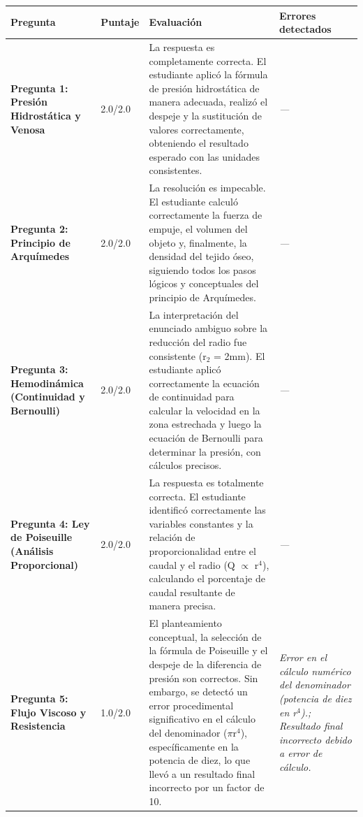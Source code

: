 \documentclass[11pt,a4paper]{article}
\begin{document}
\begin{longtable}{>{\bfseries}p{2.8cm} p{1.6cm} p{7.0cm} p{2.8cm}}
  \toprule
  \textbf{Pregunta} & \textbf{Puntaje} & \textbf{Evaluación} & \textbf{Errores detectados} \\
  \midrule
  \endhead
  \bottomrule
  \endfoot
    \textbf{Pregunta 1: Presión Hidrostática y Venosa} & 2.0/2.0 & La respuesta es completamente correcta. El estudiante aplicó la fórmula de presión hidrostática de manera adecuada, realizó el despeje y la sustitución de valores correctamente, obteniendo el resultado esperado con las unidades consistentes. & \textit{---} \\
    \midrule
    \textbf{Pregunta 2: Principio de Arquímedes} & 2.0/2.0 & La resolución es impecable. El estudiante calculó correctamente la fuerza de empuje, el volumen del objeto y, finalmente, la densidad del tejido óseo, siguiendo todos los pasos lógicos y conceptuales del principio de Arquímedes. & \textit{---} \\
    \midrule
    \textbf{Pregunta 3: Hemodinámica (Continuidad y Bernoulli)} & 2.0/2.0 & La interpretación del enunciado ambiguo sobre la reducción del radio fue consistente (r$_{2}$ = 2mm). El estudiante aplicó correctamente la ecuación de continuidad para calcular la velocidad en la zona estrechada y luego la ecuación de Bernoulli para determinar la presión, con cálculos precisos. & \textit{---} \\
    \midrule
    \textbf{Pregunta 4: Ley de Poiseuille (Análisis Proporcional)} & 2.0/2.0 & La respuesta es totalmente correcta. El estudiante identificó correctamente las variables constantes y la relación de proporcionalidad entre el caudal y el radio (Q $\propto$ r$^{4}$), calculando el porcentaje de caudal resultante de manera precisa. & \textit{---} \\
    \midrule
    \textbf{Pregunta 5: Flujo Viscoso y Resistencia} & 1.0/2.0 & El planteamiento conceptual, la selección de la fórmula de Poiseuille y el despeje de la diferencia de presión son correctos. Sin embargo, se detectó un error procedimental significativo en el cálculo del denominador ($\pi$r$^{4}$), específicamente en la potencia de diez, lo que llevó a un resultado final incorrecto por un factor de 10. & \textit{Error en el cálculo numérico del denominador (potencia de diez en r$^{4}$).; Resultado final incorrecto debido a error de cálculo.} \\
    \midrule
\end{longtable}

\end{document}
